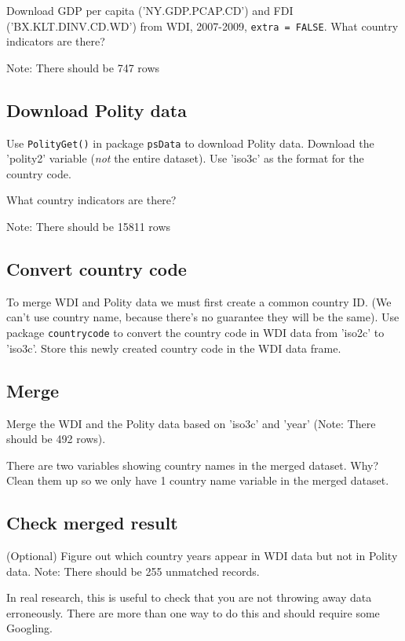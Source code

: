 \documentclass{article}\usepackage[]{graphicx}\usepackage[]{color}
\begin{document}
Download GDP per capita ('NY.GDP.PCAP.CD') and FDI ('BX.KLT.DINV.CD.WD') from WDI, 2007-2009, \verb`extra = FALSE`. What country indicators are there?

Note: There should be 747 rows

\subsection{Download Polity data}

Use \verb`PolityGet()` in package \verb`psData` to download Polity data. Download the 'polity2' variable (\textit{not} the entire dataset). Use 'iso3c' as the format for the country code.

What country indicators are there?

Note: There should be 15811 rows

\subsection{Convert country code}

To merge WDI and Polity data we must first create a common country ID. (We can't use country name, because there's no guarantee they will be the same). Use package \verb`countrycode` to convert the country code in WDI data from 'iso2c' to 'iso3c'. Store this newly created country code in the WDI data frame.

\subsection{Merge}

Merge the WDI and the Polity data based on 'iso3c' and 'year' (Note: There should be 492 rows).

There are two variables showing country names in the merged dataset. Why? Clean them up so we only have 1 country name variable in the merged dataset.

\subsection{Check merged result}

(Optional) Figure out which country years appear in WDI data but not in Polity data. Note: There should be 255 unmatched records.

In real research, this is useful to check that you are not throwing away data erroneously. There are more than one way to do this and should require some Googling.
\end{document}
